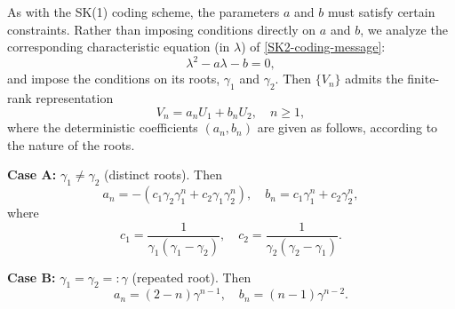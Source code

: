 \documentclass[12pt]{article}
\begin{document}
As with the SK(1) coding scheme, the parameters $a$ and $b$ must satisfy certain constraints. Rather than imposing conditions directly on $a$ and $b$, we analyze the corresponding characteristic equation (in $\lambda$) of \eqref{SK2-coding-message}:
\begin{equation}\label{sk2-char-eqn}
   \lambda^2 - a\lambda - b =0,
\end{equation}
and impose the conditions on its roots, $\gamma_1$ and $\gamma_2$. Then $\{V_n\}$ admits the finite-rank representation
\begin{equation*}\label{Vn-genaral-sol}
   V_n = a_n U_1 +b_n U_2,\quad n\ge1,
\end{equation*}
where the deterministic coefficients $(a_n,b_n)$ are given as follows, according to the nature of the roots.

\textbf{Case A:} $\gamma_1 \neq \gamma_2$ (distinct roots). Then 
\begin{equation}\label{Vn-case-a}
   a_n = -(c_1\gamma_2\gamma_1^n +c_2\gamma_1\gamma_2^n),\quad b_n = c_1\gamma_1^n +c_2\gamma_2^n,
\end{equation}
where
$$
   c_1 = \frac{1}{\gamma_1(\gamma_1-\gamma_2)},\quad c_2 = \frac{1}{\gamma_2(\gamma_2-\gamma_1)}.
$$

\textbf{Case B:} $\gamma_1 = \gamma_2 =: \gamma$ (repeated root). Then
\begin{equation}\label{Vn-case-b}
   a_n = (2-n)\gamma^{n-1},\quad b_n = (n-1)\gamma^{n-2}.
\end{equation}

    
\end{document}

